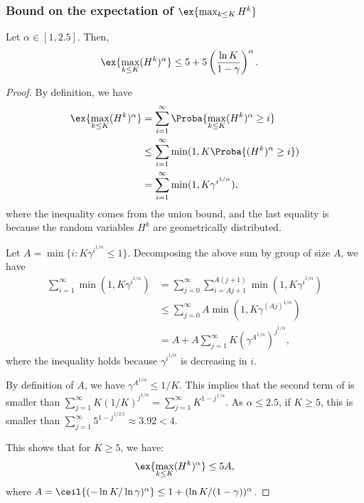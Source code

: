 \begin{subappendices}
\subsubsection{Bound on the expectation of \texorpdfstring{$\ex{\max_{k\le K}H^k}$}{}}

\begin{lem}
    \label{lem:moment}
    Let $\alpha\in[1,2.5]$. Then,
    \begin{align}
        \label{eq:lemma_HK}
        \ex{\max_{k\le K}(H^k)^\alpha} &\le 5+5\left(\frac{\ln K}{1-\gamma}\right)^\alpha.
    \end{align}
 \end{lem}
 \begin{proof}
    By definition, we have
    \begin{align*}
        \ex{\max_{k\le K}(H^k)^\alpha} &=  \sum_{i=1}^\infty \Proba{ \max_{k\le K}(H^k)^\alpha \ge i}\\
        &\le \sum_{i=1}^\infty \min(1, K \Proba{ (H^k)^\alpha \ge i})\\
        &= \sum_{i=1}^\infty \min(1, K \gamma^{i^{1/\alpha}}),
    \end{align*}
    where the inequality comes from the union bound, and the last equality is because the random variables $H^k$ are geometrically distributed.
 
    Let $A=\min\{i : K \gamma^{i^{1/\alpha}}\le 1\}$. Decomposing the above sum by group of size $A$, we have
    \begin{align}
        \sum_{i=1}^\infty \min(1, K \gamma^{i^{1/\alpha}})
        &= \sum_{j=0}^\infty \sum_{i=Aj+1}^{A(j+1)}\min(1, K \gamma^{i^{1/\alpha}})\nonumber\\
        &\le \sum_{j=0}^\infty A \min(1, K \gamma^{(Aj)^{1/\alpha}})\nonumber\\
        &= A + A\sum_{j=1}^\infty K (\gamma^{A^{1/\alpha}})^{j^{1/\alpha}},
        \label{eq:sum_A}
    \end{align}
    where the inequality holds because $\gamma^{i^{1/\alpha}}$ is decreasing in $i$. 
 
    By definition of $A$, we have $\gamma^{A^{1/\alpha}}\le 1/K$. This implies that the second term of  is smaller than $\sum_{j=1}^\infty K (1/K)^{j^{1/\alpha}}=\sum_{j=1}^\infty K^{1-j^{1/\alpha}}$. As $\alpha\le 2.5$, if  $K\ge5$, this is smaller than $\sum_{j=1}^\infty 5^{1-j^{1/2.5}}\approx 3.92<4$.
 
    This shows that for $K\ge5$, we have:
    \begin{align*}
        \ex{\max_{k\le K}(H^k)^\alpha} \le 5A,
    \end{align*}
    where $A=\ceil{(-\ln K/\ln \gamma)^{\alpha}}\le 1+(\ln K/(1-\gamma ))^\alpha$.
 

\end{proof}
\end{subappendices}
